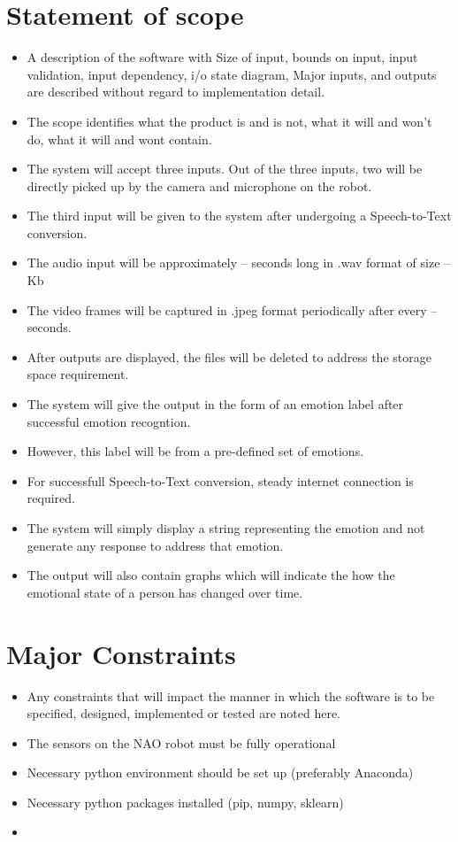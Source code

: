 \documentclass[oneside,a4paper,12pt]{report}
\begin{document}
\begin{normalsize}
 \section{Statement of scope}
	\begin{itemize}  
	\item	A description of the software with Size of input, bounds on input, input validation, input dependency, i/o state diagram, Major inputs, and outputs are described without regard to implementation detail.
	\item The scope identifies what the product is and is not, what it will and won’t do, what it will and wont contain.
	
	
	\item The system will accept three inputs. Out of the three inputs, two will be directly picked up by the camera and microphone on the robot.
	\item The third input will be given to the system after undergoing a Speech-to-Text conversion.
	\item The audio input will be approximately -- seconds long in .wav format of size -- Kb
	\item The video frames will be captured in .jpeg format periodically after every -- seconds.
	\item After outputs are displayed, the files will be deleted to address the storage space requirement.
	\item The system will give the output in the form of an emotion label after successful emotion recogntion.
	\item However, this label will be from a pre-defined set of emotions.
	\item For successfull Speech-to-Text conversion, steady internet connection is required.
	\item The system will simply display a string representing the emotion and not generate any response to address that emotion.
	\item The output will also contain graphs which will indicate the how the emotional state of a person has changed over time.
	\end{itemize}

\vspace{4mm}
\section{Major Constraints}
\begin{itemize}
\item Any constraints that will impact the manner in which the software is to be specified, designed, implemented or tested are noted here.
\item The sensors on the NAO robot must be fully operational
\item Necessary python environment should be set up (preferably Anaconda)
\item Necessary python packages installed (pip, numpy, sklearn)
\item 


\end{itemize}
\end{normalsize}
\end{document}
